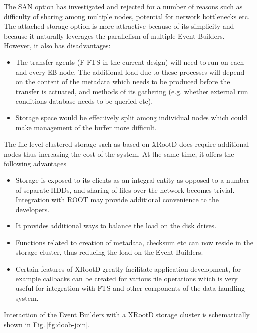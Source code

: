 \documentclass[pdftex,12pt,letter]{article}
\newcommand{\xrd}{XRootD\xspace}
\begin{document}
\noindent The SAN option has investigated and rejected for a number of reasons such as difficulty of sharing among multiple
nodes, potential for network bottlenecks etc. The attached storage option is more attractive because of its simplicity and because it
naturally leverages the parallelism of multiple Event Builders.
However, it also has disadvantages:
\begin{itemize}
\item The transfer agents (F-FTS in the current design) will need to run on each and every EB node. The additional load
due to these processes will depend on the content of the metadata which needs to be produced before the
transfer is actuated, and methods of its gathering (e.g. whether external run conditions database needs to be queried etc).

\item Storage space would be effectively split among individual nodes which could make management of the buffer more difficult.
\end{itemize}

\noindent The file-level clustered storage such as based on \xrd \cite{xrootd} does require additional nodes thus increasing the cost of the system.
At the same time, it offers the following advantages
\begin{itemize}
\item Storage is exposed to its clients as an integral entity as opposed to a number of separate HDDs, and sharing of files over the network
becomes trivial. Integration with ROOT may provide additional convenience to the developers.

\item It provides additional ways to balance the load on the disk drives.

\item Functions related to creation of metadata, checksum etc can now reside in the storage cluster, thus reducing
the load on the Event Builders.

\item Certain features of \xrd  greatly facilitate application development, for example callbacks can be created for various
file operations which is very useful for integration with FTS and other components of the data handling system.
\end{itemize}

\noindent Interaction of the Event Builders with a \xrd storage cluster is schematically shown in Fig.\,\ref{fig:doob-join}.
\end{document}
